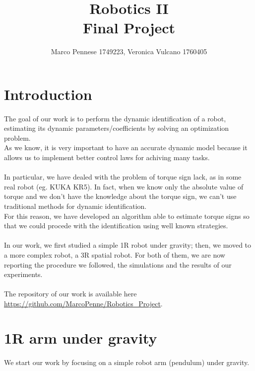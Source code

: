 \documentclass{article}
\title{\textbf{Robotics II} \\ \large{\textbf{Final Project}}}
\author{Marco Pennese 1749223, Veronica Vulcano 1760405}
\date{}
\begin{document}
\maketitle
\tableofcontents
\pagebreak

\section{Introduction}
\paragraph{}The goal of our work is to perform the dynamic identification of a robot, estimating its dynamic parameters/coefficients by solving an optimization problem.\\
As we know, it is very important to have an accurate dynamic model because it allows us to implement better control laws for achiving many tasks.\\\\
In particular, we have dealed with the problem of torque sign lack, as in some real robot (eg. KUKA KR5). In fact, when we know only the absolute value of torque and we don't have the knowledge about the torque sign, we can't use traditional methods for dynamic identification.\\
For this reason, we have developed an algorithm able to estimate torque signs so that we could procede with the identification using well known strategies.
\paragraph{}In our work, we first studied a simple 1R robot under gravity; then, we moved to a more complex robot, a 3R spatial robot. For both of them, we are now reporting the procedure we followed, the simulations and the results of our experiments.\\\\

The repository of our work is available here \url{https://github.com/MarcoPenne/Robotics_Project}.

\section{1R arm under gravity}
\paragraph{}We start our work by focusing on a simple robot arm (pendulum) under gravity.
\end{document}
